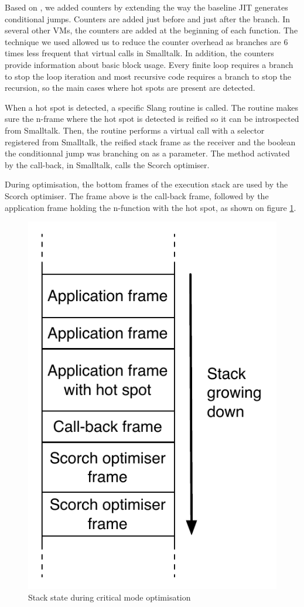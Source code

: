 \documentclass[a4paper,12pt,twoside]{../includes/ThesisStyle}
\begin{document}

Based on \cite{Arn02}, we added counters by extending the way the baseline JIT generates conditional jumps. Counters are added just before and just after the branch. In several other VMs, the counters are added at the beginning of each function. The technique we used allowed us to reduce the counter overhead as branches are 6 times less frequent that virtual calls in Smalltalk. In addition, the counters provide information about basic block usage. Every finite loop requires a branch to stop the loop iteration and most recursive code requires a branch to stop the recursion, so the main cases where hot spots are present are detected.

When a hot spot is detected, a specific Slang routine is called. The routine makes sure the n-frame where the hot spot is detected is reified so it can be introspected from Smalltalk. Then, the routine performs a virtual call with a selector registered from Smalltalk, the reified stack frame as the receiver and the boolean the conditionnal jump was branching on as a parameter. The method activated by the call-back, in Smalltalk, calls the Scorch optimiser.

During optimisation, the bottom frames of the execution stack are used by the Scorch optimiser. The frame above is the call-back frame, followed by the application frame holding the n-function with the hot spot, as shown on figure \ref{fig:HotSpotCallBackStack}.

\begin{figure}[h!]
    \begin{center}
        \includegraphics[width=0.35\linewidth]{HotSpotCallBackStack}
        \caption{Stack state during critical mode optimisation}
        \label{fig:HotSpotCallBackStack}
    \end{center}
\end{figure}
\end{document}
